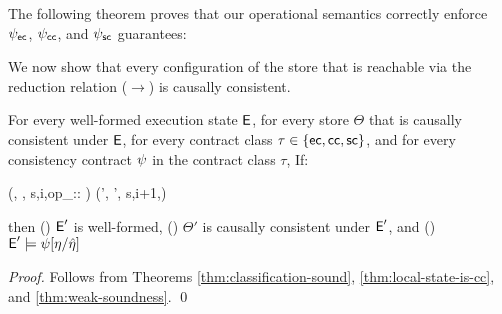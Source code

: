 The following theorem proves that our operational semantics correctly
enforce $\psi_{\sf ec}$, $\psi_{\sf cc}$, and $\psi_{\sf sc}$ guarantees:



We now show that every configuration of the store that is reachable
via the reduction relation ($\xrightarrow{}$) is causally consistent.



\begin{corollary}[Soundness]
  \label{thm:soundness}
  For every well-formed execution state ${\normalfont \textsf{E}}$, for every store $\Theta$
  that is causally consistent under ${\normalfont \textsf{E}}$, for every contract class $\tau
  \in \{{\sf ec},{\sf cc},{\sf sc}\}$, and for every consistency
  contract $\psi$ in the contract class $\tau$, If:
  \begin{smathpar}
  (\E, \Theta, \langle s,i,op_\tau :: 
  \sigma \rangle \pll \Sigma) \xrightarrow{\eff} (\E', \Theta',
  \langle s,i+1,\sigma \rangle \pll \Sigma)
  \end{smathpar}
  then () ${\normalfont \textsf{E}}'$ is well-formed, ()
  $\Theta'$ is causally consistent under ${\normalfont \textsf{E}}'$, and ()
  ${\normalfont \textsf{E}}' \models \psi[\eta/\hat{\eta}]$
\end{corollary}
\begin{proof}
  Follows from Theorems \ref{thm:classification-sound},
  \ref{thm:local-state-is-cc}, and \ref{thm:weak-soundness}.
  \qed
\end{proof}



